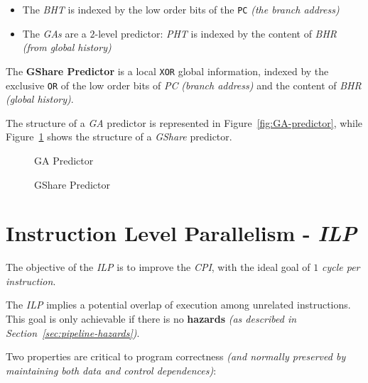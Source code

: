 \documentclass[english]{article}
\begin{document}
\begin{itemize}
  \item The \textit{BHT} is indexed by the low order bits of the \texttt{PC} \textit{(the branch address)}
  \item The \textit{GAs} are a \(2\)-level predictor: \textit{PHT} is indexed by the content of \textit{BHR} \textit{(from global history)}
\end{itemize}

\bigskip

The \textbf{GShare Predictor} is a local \texttt{XOR} global information, indexed by the exclusive \texttt{OR} of the low order bits of \textit{PC} \textit{(branch address)} and the content of \textit{BHR} \textit{(global history)}.

\bigskip
The structure of a \textit{GA} predictor is represented in Figure~\ref{fig:GA-predictor}, while Figure~\ref{fig:GShare-predictor} shows the structure of a \textit{GShare} predictor.

\begin{figure}[htbp]
  \bigskip
  \centering
  \begin{minipage}[b]{0.6\textwidth}
    \centering
    \caption{GA Predictor}
    \label{fig:GA-predictor}
  \end{minipage}
  \begin{minipage}[b]{0.39\textwidth}
    \centering
    \caption{GShare Predictor}
    \label{fig:GShare-predictor}
  \end{minipage}
  \bigskip
\end{figure}

\clearpage

\section{Instruction Level Parallelism - \textit{ILP}}

The objective of the \textit{ILP} is to improve the \textit{CPI}, with the ideal goal of \(1\) \textit{cycle per instruction}.

The \textit{ILP} implies a potential overlap of execution among unrelated instructions.
This goal is only achievable if there is no \textbf{hazards} \textit{(as described in Section~\ref{sec:pipeline-hazards})}.

\bigskip
Two properties are critical to program correctness \textit{(and normally preserved by maintaining both data and control dependences)}:
\end{document}
